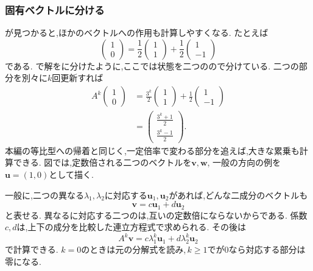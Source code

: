 \subsubsection{固有ベクトルに分ける}

が見つかると,ほかのベクトルへの作用も計算しやすくなる.
たとえば
\[
  \begin{pmatrix}1\\0\end{pmatrix}
  =\frac12\begin{pmatrix}1\\1\end{pmatrix}
   +\frac12\begin{pmatrix}1\\-1\end{pmatrix}
\]
である.
で解をに分けたように,ここでは状態を二つのので分けている.
二つの部分を別々に$k$回更新すれば
\[
  \begin{aligned}
    A^k\begin{pmatrix}1\\0\end{pmatrix}
      &=\frac{3^k}{2}\begin{pmatrix}1\\1\end{pmatrix}
        +\frac12\begin{pmatrix}1\\-1\end{pmatrix}\\
      &=\begin{pmatrix}\frac{3^k+1}{2}\\\frac{3^k-1}{2}\end{pmatrix}.
  \end{aligned}
\]
本編の等比型への帰着と同じく,一定倍率で変わる部分を追えば,大きな累乗も計算できる.
図では,定数倍される二つのベクトルを$\boldsymbol v,\boldsymbol w$,
一般の方向の例を$\boldsymbol u=(1,0)$として描く.
  \BookFigEigen

一般に,二つの異なる$\lambda_1,\lambda_2$に対応する$\boldsymbol{u}_1,\boldsymbol{u}_2$があれば,どんな二成分のベクトルも
\[
  \boldsymbol{v}=c\boldsymbol{u}_1+d\boldsymbol{u}_2
\]
と表せる.
異なるに対応する二つのは,互いの定数倍にならないからである.
係数$c,d$は,上下の成分を比較した連立方程式で求められる.
その後は
\[
  A^k\boldsymbol{v}
  =c\lambda_1^k\boldsymbol{u}_1+d\lambda_2^k\boldsymbol{u}_2
\]
で計算できる.
$k=0$のときは元の分解式を読み,\,$k\ge1$でが$0$なら対応する部分は零になる.

